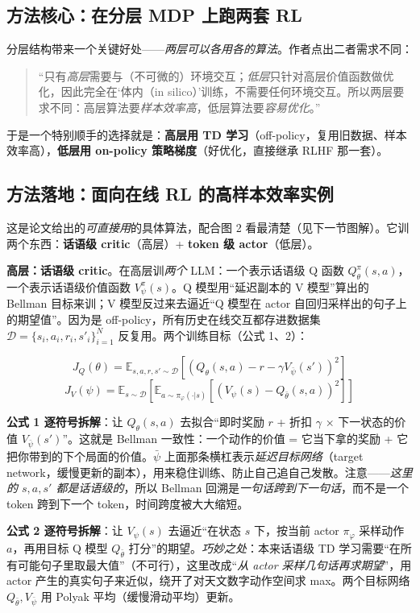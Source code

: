 \documentclass[11pt,UTF8,fontset=fandol]{ctexart}
\begin{document}
\subsection{方法核心：在分层 MDP 上跑两套 RL}

分层结构带来一个关键好处——\emph{两层可以各用各的算法}。作者点出二者需求不同：
\begin{quote}
“只有\emph{高层}需要与（不可微的）环境交互；\emph{低层}只针对高层价值函数做优化，因此完全在‘体内（in silico）’训练，不需要任何环境交互。所以两层要求不同：高层算法要\emph{样本效率高}，低层算法要\emph{容易优化}。”
\end{quote}
于是一个特别顺手的选择就是：\textbf{高层用 TD 学习}（off-policy，复用旧数据、样本效率高），\textbf{低层用 on-policy 策略梯度}（好优化，直接继承 RLHF 那一套）。

\subsection{方法落地：面向在线 RL 的高样本效率实例}

这是论文给出的\emph{可直接用}的具体算法，配合图 2 看最清楚（见下一节图解）。它训两个东西：\textbf{话语级 critic}（高层）+ \textbf{token 级 actor}（低层）。

\textbf{高层：话语级 critic}。在高层训\emph{两个} LLM：一个表示话语级 Q 函数 $Q^\pi_\theta(s,a)$，一个表示话语级价值函数 $V^\pi_\psi(s)$。Q 模型用“延迟副本的 V 模型”算出的 Bellman 目标来训；V 模型反过来去逼近“Q 模型在 actor 自回归采样出的句子上的期望值”。因为是 off-policy，所有历史在线交互都存进数据集 $\mathcal{D}=\{s_i,a_i,r_i,s'_i\}_{i=1}^N$ 反复用。两个训练目标（公式 1、2）：

\[ J_Q(\theta)=\mathbb{E}_{s,a,r,s'\sim\mathcal{D}}\left[(Q_\theta(s,a)-r-\gamma V_{\bar{\psi}}(s'))^2\right] \tag{1} \]
\[ J_V(\psi)=\mathbb{E}_{s\sim\mathcal{D}}\left[\mathbb{E}_{a\sim\pi_\varphi(\cdot|s)}\left[(V_\psi(s)-Q_{\bar{\theta}}(s,a))^2\right]\right] \tag{2} \]

\textbf{公式 1 逐符号拆解}：让 $Q_\theta(s,a)$ 去拟合“即时奖励 $r$ + 折扣 $\gamma$ × 下一状态的价值 $V_{\bar\psi}(s')$”。这就是 Bellman 一致性：一个动作的价值 = 它当下拿的奖励 + 它把你带到的下个局面的价值。$\bar\psi$ 上面那条横杠表示\emph{延迟目标网络}（target network，缓慢更新的副本），用来稳住训练、防止自己追自己发散。注意——\emph{这里的 $s,a,s'$ 都是话语级的}，所以 Bellman 回溯是\emph{一句话跨到下一句话}，而不是一个 token 跨到下一个 token，时间跨度被大大缩短。

\textbf{公式 2 逐符号拆解}：让 $V_\psi(s)$ 去逼近“在状态 $s$ 下，按当前 actor $\pi_\varphi$ 采样动作 $a$，再用目标 Q 模型 $Q_{\bar\theta}$ 打分”的期望。\emph{巧妙之处}：本来话语级 TD 学习需要“在所有可能句子里取最大值”（不可行），这里改成“\emph{从 actor 采样几句话再求期望}”，用 actor 产生的真实句子来近似，绕开了对天文数字动作空间求 max。两个目标网络 $Q_{\bar\theta}, V_{\bar\psi}$ 用 Polyak 平均（缓慢滑动平均）更新。
\end{document}
